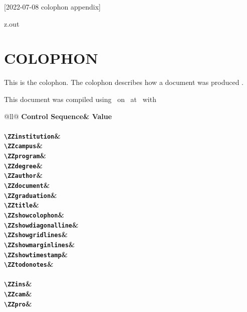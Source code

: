 [2022-07-08 colophon appendix]

\begin{VerbatimOut}{z.out}
\chapter*{COLOPHON}
\label{ap:colophon}


This is the colophon.
The colophon describes how a document was produced
\cite{diggypod-colophon}.

This document was compiled using \PurdueThesisVersion\ on \ZZDateRun\ at \ZZTimeRun\ with

\hspace*{2\parindent}\begin{tabular}{@{}ll@{}}
  \noalign{\vspace*{6pt}}
  \toprule
  \bf Control Sequence& \bf Value\\
  \midrule
  \\
  \verb+\ZZinstitution+& \ZZinstitution\\
  \verb+\ZZcampus+& \ZZcampus\\
  \verb+\ZZprogram+& \ZZprogram\\
  \verb+\ZZdegree+& \ZZdegree\\
  \verb+\ZZauthor+& \ZZauthor\\
  \verb+\ZZdocument+& \ZZdocument\\
  \verb+\ZZgraduation+& \ZZgraduation\\
  \verb+\ZZtitle+& \ZZtitle\\
  \noalign{\vspace*{6pt}}
  \verb+\ZZshowcolophon+& \ZZshowcolophon\\
  \verb+\ZZshowdiagonalline+& \ZZshowdiagonalline\\
  \verb+\ZZshowgridlines+& \ZZshowgridlines\\
  \verb+\ZZshowmarginlines+& \ZZshowmarginlines\\
  \verb+\ZZshowtimestamp+& \ZZshowtimestamp\\
  \verb+\ZZtodonotes+& \ZZtodonotes\\
  \noalign{\vspace*{12pt}}
  \\
  \verb+\ZZins+& \ZZins\\
  \verb+\ZZcam+& \ZZcam\\
  \verb+\ZZpro+& \ZZpro\\

\end{tabular}
\end{VerbatimOut}
